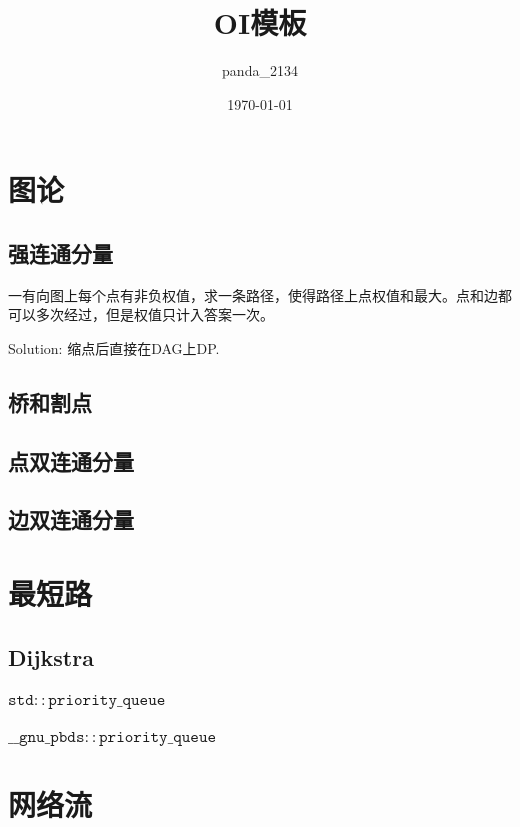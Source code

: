 \documentclass{article}
\title{OI模板}
\author{panda\_2134}
\date{\today}
\begin{document}
	\makeatletter
	\lst@CCPutMacro
    	\@empty\z@\@empty
	\makeatother

	\maketitle
	\newpage
	\tableofcontents
	\newpage

	\section{图论}
		\subsection{强连通分量}
		
		一有向图上每个点有非负权值，求一条路径，使得路径上点权值和最大。点和边都可以多次经过，但是权值只计入答案一次。
		
		Solution: 缩点后直接在DAG上DP.
		
		
		\subsection{桥和割点}
		\subsection{点双连通分量}
		\subsection{边双连通分量}

	\newpage
	\section{最短路}
		\subsection{Dijkstra}
			\subsubsection{$\mathtt{std::priority\_queue}$}
			
			\subsubsection{$\mathtt{\_ \_ gnu\_pbds::priority\_queue}$}
	\section{网络流}
\end{document}

